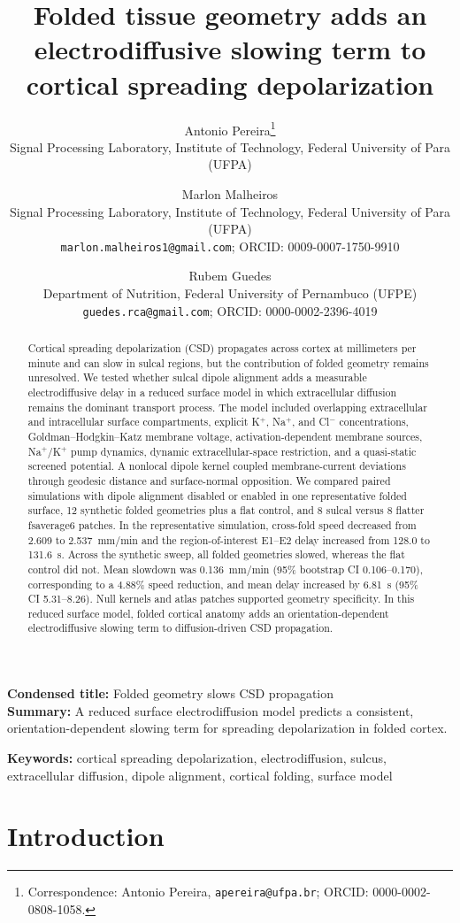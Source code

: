 \documentclass[12pt]{article}
\title{Folded tissue geometry adds an electrodiffusive slowing term to cortical spreading depolarization}
\author{
Antonio Pereira\thanks{Correspondence: Antonio Pereira, \texttt{apereira@ufpa.br}; ORCID: 0000-0002-0808-1058.}\\
\small Signal Processing Laboratory, Institute of Technology, Federal University of Para (UFPA)
\and
Marlon Malheiros \\
\small Signal Processing Laboratory, Institute of Technology, Federal University of Para (UFPA) \\
\small \texttt{marlon.malheiros1@gmail.com}; ORCID: 0009-0007-1750-9910
\and
Rubem Guedes\\
\small Department of Nutrition, Federal University of Pernambuco (UFPE)\\
\small \texttt{guedes.rca@gmail.com}; ORCID: 0000-0002-2396-4019
}
\date{}
\newcommand{\ShortTitle}{Folded geometry slows CSD propagation}
\newcommand{\TOCSummary}{A reduced surface electrodiffusion model predicts a consistent, orientation-dependent slowing term for spreading depolarization in folded cortex.}
\begin{document}
\maketitle

\begin{center}
\parbox{0.95\textwidth}{\small
\textbf{Condensed title:} \ShortTitle\\
\textbf{Summary:} \TOCSummary}
\end{center}

\begin{abstract}
Cortical spreading depolarization (CSD) propagates across cortex at millimeters per minute and can slow in sulcal regions, but the contribution of folded geometry remains unresolved. We tested whether sulcal dipole alignment adds a measurable electrodiffusive delay in a reduced surface model in which extracellular diffusion remains the dominant transport process. The model included overlapping extracellular and intracellular surface compartments, explicit K$^+$, Na$^+$, and Cl$^-$ concentrations, Goldman--Hodgkin--Katz membrane voltage, activation-dependent membrane sources, Na$^+$/K$^+$ pump dynamics, dynamic extracellular-space restriction, and a quasi-static screened potential. A nonlocal dipole kernel coupled membrane-current deviations through geodesic distance and surface-normal opposition. We compared paired simulations with dipole alignment disabled or enabled in one representative folded surface, 12 synthetic folded geometries plus a flat control, and 8 sulcal versus 8 flatter fsaverage6 patches. In the representative simulation, cross-fold speed decreased from 2.609 to 2.537~mm/min and the region-of-interest E1--E2 delay increased from 128.0 to 131.6~s. Across the synthetic sweep, all folded geometries slowed, whereas the flat control did not. Mean slowdown was 0.136~mm/min (95\% bootstrap CI 0.106--0.170), corresponding to a 4.88\% speed reduction, and mean delay increased by 6.81~s (95\% CI 5.31--8.26). Null kernels and atlas patches supported geometry specificity. In this reduced surface model, folded cortical anatomy adds an orientation-dependent electrodiffusive slowing term to diffusion-driven CSD propagation.
\end{abstract}

\noindent \textbf{Keywords:} cortical spreading depolarization, electrodiffusion, sulcus, extracellular diffusion, dipole alignment, cortical folding, surface model

\section{Introduction}
\end{document}
